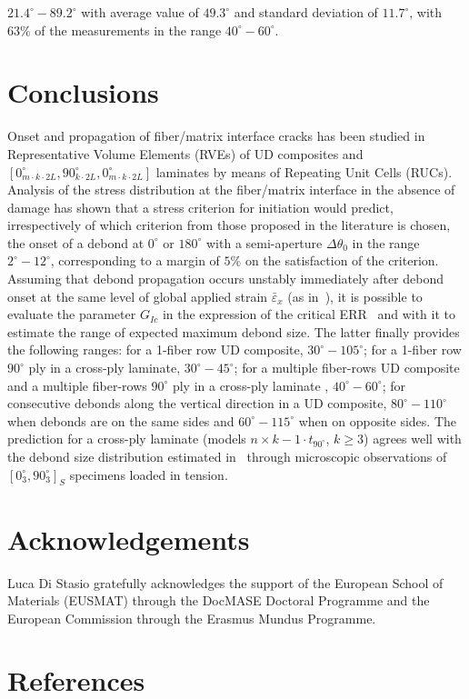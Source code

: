 $21.4^{\circ}-89.2^{\circ}$ with average value of $49.3^{\circ}$ and standard deviation of $11.7^{\circ}$, with $63\%$ of the measurements in the range $40^{\circ}-60^{\circ}$.

\section{Conclusions}

Onset and propagation of fiber/matrix interface cracks has been studied in Representative Volume Elements (RVEs) of UD composites and $\left[0_{m\cdot k\cdot2L}^{\circ},90_{k\cdot2L}^{\circ},0_{m\cdot k\cdot2L}^{\circ}\right]$ laminates by means of Repeating Unit Cells (RUCs). Analysis of the stress distribution at the fiber/matrix interface in the absence of damage has shown that a stress criterion for initiation would predict, irrespectively of which criterion from those proposed in the literature is chosen, the onset of a debond at $0^{\circ}$ or $180^{\circ}$ with a semi-aperture $\Delta\theta_{0}$ in the range $2^{\circ}-12^{\circ}$, corresponding to a margin of $5\%$ on the satisfaction of the criterion. Assuming that debond propagation occurs unstably immediately after debond onset at the same level of global applied strain $\bar{\varepsilon}_{x}$ (as in~\cite{Correa2016}), it is possible to evaluate the parameter $G_{Ic}$ in the expression of the critical ERR~\cite{Hutchinson1991} and with it to estimate the range of expected maximum debond size. The latter finally provides the following ranges: for a 1-fiber row UD composite, $30^{\circ}-105^{\circ}$; for a 1-fiber row $90^{\circ}$ ply in a cross-ply laminate, $30^{\circ}-45^{\circ}$; for a multiple fiber-rows UD composite and a multiple fiber-rows $90^{\circ}$ ply in a cross-ply laminate , $40^{\circ}-60^{\circ}$; for consecutive debonds along the vertical direction in a UD composite, $80^{\circ}-110^{\circ}$ when debonds are on the same sides and $60^{\circ}-115^{\circ}$ when on opposite sides. The prediction for a cross-ply laminate (models $n\times k-1\cdot t_{90^{\circ}}$, $k\geq3$) agrees well with the debond size distribution estimated in~\cite{Correa2018} through microscopic observations of $\left[0^{\circ}_{3},90^{\circ}_{3}\right]_{S}$ specimens loaded in tension.

\section*{Acknowledgements}

Luca Di Stasio gratefully acknowledges the support of the European School of Materials (EUSMAT) through the DocMASE Doctoral Programme and the European Commission through the Erasmus Mundus Programme.

\section*{References}
\printbibliography[heading=none]
